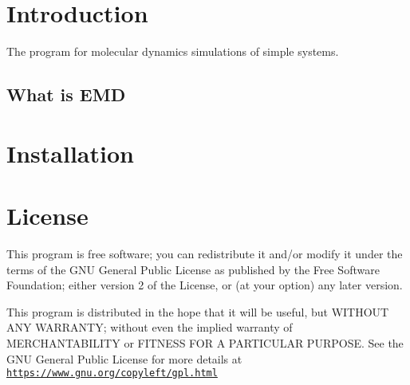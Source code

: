 \hypertarget{index_intro_sec}{}\section{Introduction}\label{index_intro_sec}
The program for molecular dynamics simulations of simple systems.\hypertarget{index_what_sub}{}\subsection{What is E\+M\+D}\label{index_what_sub}
\hypertarget{index_install_sec}{}\section{Installation}\label{index_install_sec}
\hypertarget{index_License}{}\section{License}\label{index_License}
This program is free software; you can redistribute it and/or modify it under the terms of the G\+N\+U General Public License as published by the Free Software Foundation; either version 2 of the License, or (at your option) any later version.

This program is distributed in the hope that it will be useful, but W\+I\+T\+H\+O\+U\+T A\+N\+Y W\+A\+R\+R\+A\+N\+T\+Y; without even the implied warranty of M\+E\+R\+C\+H\+A\+N\+T\+A\+B\+I\+L\+I\+T\+Y or F\+I\+T\+N\+E\+S\+S F\+O\+R A P\+A\+R\+T\+I\+C\+U\+L\+A\+R P\+U\+R\+P\+O\+S\+E. See the G\+N\+U General Public License for more details at \href{https://www.gnu.org/copyleft/gpl.html}{\tt https\+://www.\+gnu.\+org/copyleft/gpl.\+html} 